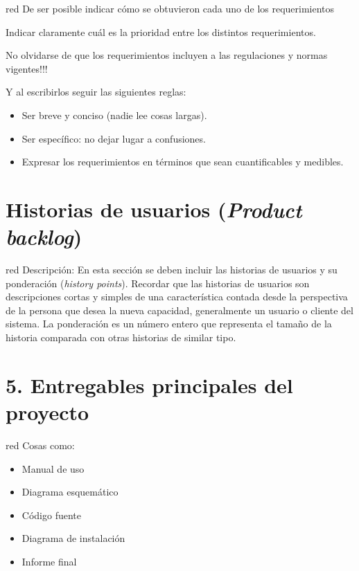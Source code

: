 \documentclass[11pt]{charter}
\begin{document}
\begin{consigna}{red}
De ser posible indicar cómo se obtuvieron cada uno de los requerimientos 

Indicar claramente cuál es la prioridad entre los distintos requerimientos. 

No olvidarse de que los requerimientos incluyen a las regulaciones y normas vigentes!!!

Y al escribirlos seguir las siguientes reglas:
\begin{itemize}
\item Ser breve y conciso (nadie lee cosas largas). 
\item Ser específico: no dejar lugar a confusiones.
\item Expresar los requerimientos en términos que sean cuantificables y medibles.
\end{itemize}

\end{consigna}

\section{Historias de usuarios (\textit{Product backlog})}
\label{sec:backlog}

\begin{consigna}{red}
Descripción: En esta sección se deben incluir las historias de usuarios y su ponderación (\textit{history points}). Recordar que las historias de usuarios son descripciones cortas y simples de una característica contada desde la perspectiva de la persona que desea la nueva capacidad, generalmente un usuario o cliente del sistema. La ponderación es un número entero que representa el tamaño de la historia comparada con otras historias de similar tipo.
\end{consigna}

\section{5. Entregables principales del proyecto}
\label{sec:entregables}

\begin{consigna}{red}
Cosas como: 
\begin{itemize}
\item Manual de uso
\item Diagrama esquemático
\item Código fuente
\item Diagrama de instalación
\item Informe final

\end{itemize}

\end{consigna}
\end{document}
